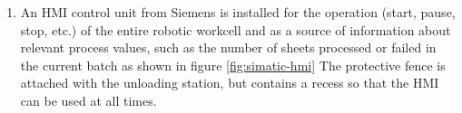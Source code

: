 \begin{enumerate}
    \item An HMI control unit from Siemens is installed for the operation (start, pause, stop, etc.) of the entire robotic workcell and as
    a source of information about relevant process values, such as the number of sheets processed or failed in the current batch as shown in figure \ref{fig:simatic-hmi} The protective fence is attached with the unloading station, but contains a recess so that the HMI can be used at all times.
\end{enumerate}









